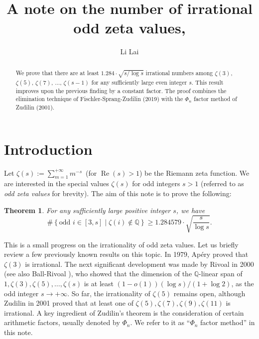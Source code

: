 \documentclass[12pt]{article}
\newtheorem{theorem}{Theorem}[section]
\numberwithin{equation}{section}
\begin{document}
\title {A note on the number of irrational odd zeta values, \uppercase\expandafter{}}

\author{Li Lai}
\date{}

\maketitle

\begin{abstract}
We prove that there are at least $1.284 \cdot \sqrt{s/\log s}$ irrational numbers among $\zeta(3)$, $\zeta(5)$, $\zeta(7)$, $\ldots$, $\zeta(s-1)$ for any sufficiently large even integer $s$. This result improves upon the previous finding by a constant factor. The proof combines the elimination technique of Fischler-Sprang-Zudilin (2019) with the $\Phi_n$ factor method of Zudilin (2001). 
\end{abstract}


\section{Introduction}

Let $\zeta(s) := \sum_{m=1}^{+\infty} m^{-s}$~(for $\operatorname{Re}(s) > 1$) be the Riemann zeta function. We are interested in the special values $\zeta(s)$ for odd integers $s>1$ (referred to as
\emph{odd zeta values} for brevity). The aim of this note is to prove the following:

\begin{theorem}\label{main_thm}
For any sufficiently large positive integer $s$, we have
\[  \# \left\{  \text{odd~} i \in [3,s]  \mid  \zeta(i) \not\in \mathbb{Q} \right\}  \geqslant 1.284579 \cdot \sqrt{\frac{s}{\log s}}.  \]
\end{theorem}

This is a small progress on the irrationality of odd zeta values. Let us briefly review a few previously known results on this topic. In 1979, Ap\'ery \cite{Ape1979} proved that $\zeta(3)$ is irrational. The next significant development was made by Rivoal \cite{Riv2000} in 2000 (see also Ball-Rivoal \cite{BR2001}), who showed that the dimension of the $\mathbb{Q}$-linear span of $1,\zeta(3),\zeta(5),\ldots,\zeta(s)$ is at least $(1-o(1))(\log s) / (1+\log 2)$, as the odd integer $s \to +\infty$. So far, the irrationality of $\zeta(5)$ remains open, although Zudilin \cite{Zud2001} in 2001 proved that at least one of $\zeta(5),\zeta(7),\zeta(9),\zeta(11)$ is irrational. A key ingredient of Zudilin's theorem is the consideration of certain arithmetic factors, usually denoted by $\Phi_n$. We refer to it as ``$\Phi_n$ factor method'' in this note.
\end{document}
